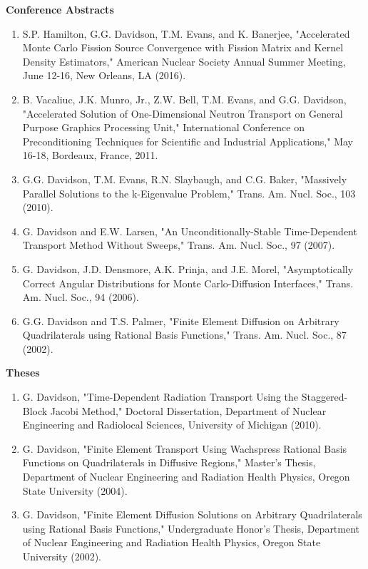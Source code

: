 \documentclass[letterpaper,11pt]{article}
\newcommand{\leftsubheading}[1]{
  \textbf{#1\vspace{-6pt} \\}}
\begin{document}
\leftsubheading{Conference Abstracts}
\begin{enumerate}
  \item S.P. Hamilton, G.G. Davidson, T.M. Evans, and K. Banerjee,
    "Accelerated Monte Carlo Fission Source Convergence with Fission
    Matrix and Kernel Density Estimators," American Nuclear Society
    Annual Summer Meeting, June 12-16, New Orleans, LA (2016).
  \item B. Vacaliuc, J.K. Munro, Jr., Z.W. Bell, T.M. Evans, and
    G.G. Davidson, "Accelerated Solution of One-Dimensional Neutron
    Transport on General Purpose Graphics Processing Unit,"
    International Conference on Preconditioning Techniques for
    Scientific and Industrial Applications," May 16-18, Bordeaux,
    France, 2011.
  \item G.G. Davidson, T.M. Evans, R.N. Slaybaugh, and C.G. Baker,
    "Massively Parallel Solutions to the k-Eigenvalue Problem,"
    Trans. Am. Nucl. Soc., 103 (2010).
  \item G. Davidson and E.W. Larsen, "An Unconditionally-Stable
    Time-Dependent Transport Method Without Sweeps,"
    Trans. Am. Nucl. Soc., 97 (2007).
  \item G. Davidson, J.D. Densmore, A.K. Prinja, and J.E. Morel,
    "Asymptotically Correct Angular Distributions for Monte
    Carlo-Diffusion Interfaces," Trans. Am. Nucl. Soc., 94 (2006).
  \item G.G. Davidson and T.S. Palmer, "Finite Element Diffusion on
    Arbitrary Quadrilaterals using Rational Basis Functions,"
    Trans. Am. Nucl. Soc., 87 (2002).
\end{enumerate}

\leftsubheading{Theses}
\begin{enumerate}
  \item G. Davidson, "Time-Dependent Radiation Transport Using the
    Staggered-Block Jacobi Method," Doctoral Dissertation, Department
    of Nuclear Engineering and Radiolocal Sciences, University of
    Michigan (2010).
  \item G. Davidson, "Finite Element Transport Using Wachspress
    Rational Basis Functions on Quadrilaterals in Diffusive Regions,"
    Master's Thesis, Department of Nuclear Engineering and Radiation
    Health Physics, Oregon State University (2004).
  \item G. Davidson, "Finite Element Diffusion Solutions on Arbitrary
    Quadrilaterals using Rational Basis Functions," Undergraduate
    Honor's Thesis, Department of Nuclear Engineering and Radiation
    Health Physics, Oregon State University (2002).
\end{enumerate}
\end{document}

